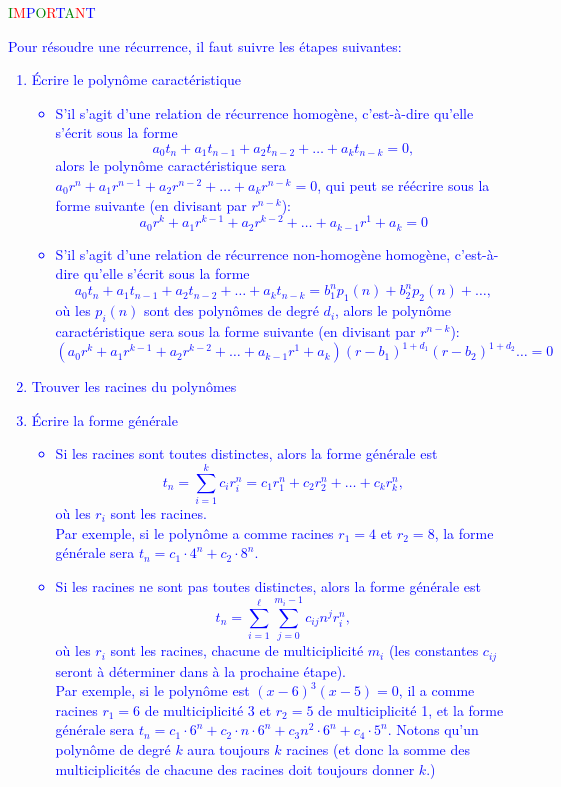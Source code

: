 \documentclass[11pt]{article} %
\begin{document}
\textcolor{green}{I}\textcolor{red}{M}\textcolor{blue}{P}\textcolor{green}{O}\textcolor{red}{R}\textcolor{blue}{T}\textcolor{green}{A}\textcolor{red}{N}\textcolor{blue}{T}
\textcolor{blue}{
	Pour résoudre une récurrence, il faut suivre les étapes suivantes:
	\begin{enumerate}
		\item Écrire le polynôme caractéristique
		\begin{itemize}
			\item S'il s'agit d'une relation de récurrence homogène, c'est-à-dire qu'elle s'écrit sous la forme
			$$a_0t_n + a_1 t_{n-1} +a_2t_{n-2} + \dots + a_kt_{n-k} = 0,$$
			alors le polynôme caractéristique sera $a_0r^n + a_1 r^{n-1}+ a_2r^{n-2}+\dots + a_k r^{n-k}=0$, qui peut se réécrire sous la forme suivante (en divisant par $r^{n-k}$):
			$$a_0r^k + a_1 r^{k-1}+a_2r^{k-2}+\dots + a_{k-1}r^1+a_k = 0$$
			\item S'il s'agit d'une relation de récurrence non-homogène homogène, c'est-à-dire qu'elle s'écrit sous la forme
			$$a_0t_n + a_1 t_{n-1} +a_2t_{n-2} + \dots + a_kt_{n-k} = b_1^np_1(n)+b_2^n p_2(n) + \dots,$$
			où les $p_i(n)$ sont des polynômes de degré $d_i$, alors le polynôme caractéristique sera sous la forme suivante (en divisant par $r^{n-k}$):
			$$(a_0r^k + a_1 r^{k-1}+a_2r^{k-2}+\dots +a_{k-1}r^1+ a_k)(r-b_1)^{1+d_1}(r-b_2)^{1+d_2}\dots = 0$$
		\end{itemize}
		\item Trouver les racines du polynômes
		\item Écrire la forme générale
		\begin{itemize}
			\item Si les racines sont toutes distinctes, alors la forme générale est $$t_n = \sum_{i=1}^k c_ir_i^n= c_1r_1^n + c_2 r_2^n + \dots + c_k r_k^n,$$ où les $r_i$ sont les racines. \\
			Par exemple, si le polynôme a comme racines $r_1 = 4$ et $r_2=8$, la forme générale sera $t_n = c_1\cdot 4^n + c_2\cdot 8^n$.
			\item Si les racines ne sont pas toutes distinctes, alors la forme générale est $$t_n = \sum_{i=1}^\ell \sum_{j=0}^{m_i-1}c_{ij}n^jr_i^n,$$ où les $r_i$ sont les racines, chacune de multiciplicité $m_i$ (les constantes $c_{ij}$ seront à déterminer dans à la prochaine étape). \\
			Par exemple, si le polynôme est $(x-6)^3(x-5)=0$, il a comme racines $r_1 = 6$ de multiciplicité 3 et $r_2=5$ de multiciplicité 1, et la forme générale sera $t_n = c_1\cdot 6^n+c_2\cdot n\cdot 6^n + c_3 n^2 \cdot6^n + c_4\cdot 5^n$. Notons qu'un polynôme de degré $k$ aura toujours $k$ racines (et donc la somme des multiciplicités de chacune des racines doit toujours donner $k$.)

\end{itemize}
\end{enumerate}}
\end{document}
